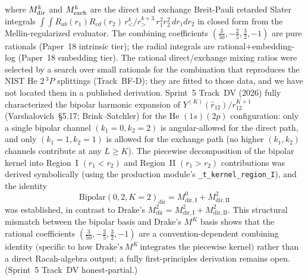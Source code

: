 \documentclass[aps,pra,twocolumn,superscriptaddress,longbibliography]{revtex4-2}
\begin{document}
where $M^k_{\rm dir}$ and $M^k_{\rm exch}$ are the direct and
exchange Breit-Pauli retarded Slater integrals
$\int\!\!\int R_{ab}(r_1) R_{cd}(r_2)\, r_<^k/r_>^{k+3}\, r_1^2 r_2^2\, dr_1 dr_2$
in closed form from the Mellin-regularized evaluator.  The
combining coefficients $(\tfrac{3}{50}, -\tfrac{2}{5}, \tfrac{3}{2}, -1)$
are pure rationals (Paper~18 intrinsic tier); the radial integrals
are rational$+$embedding-log (Paper~18 embedding tier).  The
rational direct/exchange mixing ratios were selected by a search over
small rationals for the combination that reproduces the NIST He
$2\,^3\!P$ splittings (Track~BF-D); they are fitted to those data, and
we have not located them in a published derivation.
Sprint~5 Track~DV (2026) fully characterized the bipolar harmonic
expansion of
$Y^{(K)}(\hat r_{12})/r_{12}^{K+1}$
(Varshalovich~\S5.17; Brink--Satchler) for the He
$(1s)(2p)$ configuration: only a single bipolar channel
$(k_1\!=\!0, k_2\!=\!2)$ is angular-allowed for the direct path,
and only $(k_1\!=\!1, k_2\!=\!1)$ is allowed for the exchange path
(no higher $(k_1, k_2)$ channels contribute at any $L\geq K$).  The
piecewise decomposition of the bipolar kernel into Region~I
$(r_1<r_2)$ and Region~II $(r_1>r_2)$ contributions was derived
symbolically (using the production module's
\texttt{\_t\_kernel\_region\_I}), and the identity
\[
  \text{Bipolar}(0, 2, K{=}2)_{\mathrm{dir}} = M^0_{\mathrm{dir},\mathrm{I}} + M^2_{\mathrm{dir},\mathrm{II}}
\]
was established, in contrast to Drake's
$M^2_{\mathrm{dir}} = M^2_{\mathrm{dir},\mathrm{I}} + M^2_{\mathrm{dir},\mathrm{II}}$.
This structural mismatch between the bipolar basis and Drake's
$M^K$ basis shows that the rational coefficients
$(\tfrac{3}{50}, -\tfrac{2}{5}, \tfrac{3}{2}, -1)$ are a
convention-dependent combining identity
$\bigl(\text{specific to how Drake's}\ M^K\ \text{integrates the piecewise kernel}\bigr)$
rather than a direct Racah-algebra output; a fully first-principles
derivation remains open.  (Sprint~5 Track~DV honest-partial.)
\end{document}
